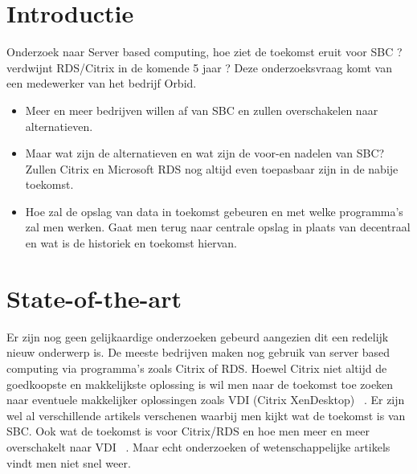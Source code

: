 
\section{Introductie} %
\label{sec:introductie}
Onderzoek naar Server based computing, hoe ziet de toekomst eruit voor SBC ? verdwijnt RDS/Citrix in de komende 5 jaar ? Deze onderzoeksvraag komt van een medewerker van het bedrijf Orbid.
\begin{itemize}
  \item Meer en meer bedrijven willen af van SBC en zullen overschakelen naar alternatieven.
  \item Maar wat zijn de alternatieven en wat zijn de voor-en nadelen van SBC? Zullen Citrix en Microsoft RDS nog altijd even toepasbaar zijn in de nabije toekomst.
  \item Hoe zal de opslag van data in toekomst gebeuren en met welke programma's zal men werken. Gaat men terug naar centrale opslag in plaats van decentraal en wat is de historiek en toekomst hiervan.
\end{itemize}


\section{State-of-the-art}
\label{sec:state-of-the-art}

Er zijn nog geen gelijkaardige onderzoeken gebeurd aangezien dit een redelijk nieuw onderwerp is. De meeste bedrijven maken nog gebruik van server based computing via programma's zoals Citrix of RDS. Hoewel Citrix niet altijd de goedkoopste en makkelijkste oplossing is wil men naar de toekomst toe zoeken naar eventuele makkelijker oplossingen zoals VDI (Citrix XenDesktop)~\autocite{GB2014} . Er zijn wel al verschillende artikels verschenen waarbij men kijkt wat de toekomst is van SBC. Ook wat de toekomst is voor Citrix/RDS en hoe men meer en meer overschakelt naar VDI ~\autocite{Madden2017}. Maar echt onderzoeken of wetenschappelijke artikels vindt men niet snel weer.



